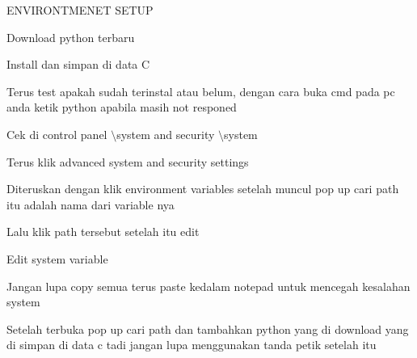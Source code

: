 
\sloppy
{\fontsize{14pt}{14pt}\selectfont ENVIRONTMENET SETUP \\} \par
\vspace{14pt}
\noindent 
{\fontsize{14pt}{14pt}\selectfont Download python terbaru \\} \par
\vspace{14pt}
\noindent 
{\fontsize{14pt}{14pt}\selectfont Install dan simpan di data C \\} \par
\vspace{14pt}
\noindent 
{\fontsize{14pt}{14pt}\selectfont Terus test apakah sudah terinstal atau belum, dengan cara buka cmd pada pc anda ketik python apabila masih not responed \\} \par
\vspace{14pt}
\noindent 
{\fontsize{14pt}{14pt}\selectfont Cek di control panel $  \setminus  $system and security $  \setminus  $system \\} \par
\vspace{14pt}
\noindent 
{\fontsize{14pt}{14pt}\selectfont Terus klik advanced system and security settings \\} \par
\vspace{14pt}
\noindent 
{\fontsize{14pt}{14pt}\selectfont Diteruskan dengan klik environment variables setelah muncul pop up cari path itu adalah nama dari variable nya \\} \par
\vspace{14pt}
\noindent 
{\fontsize{14pt}{14pt}\selectfont Lalu klik path tersebut setelah itu edit \\} \par
\vspace{14pt}
\noindent 
{\fontsize{14pt}{14pt}\selectfont Edit system variable \\} \par
\vspace{14pt}
\noindent 
{\fontsize{14pt}{14pt}\selectfont Jangan lupa copy semua terus paste kedalam notepad untuk mencegah kesalahan system \\} \par
\vspace{14pt}
\noindent 
{\fontsize{14pt}{14pt}\selectfont Setelah terbuka pop up cari path dan tambahkan python yang di download yang di simpan di data c tadi jangan lupa menggunakan tanda petik setelah itu \\} \par

